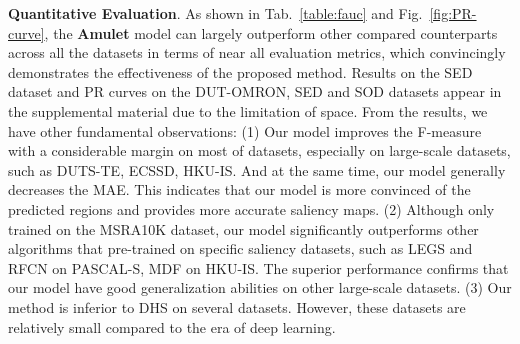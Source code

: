 \documentclass[10pt,twocolumn,letterpaper]{article}
\begin{document}
\textbf{Quantitative Evaluation}. As shown in Tab.~\ref{table:fauc} and Fig.~\ref{fig:PR-curve}, the \textbf{Amulet} model can largely outperform other compared counterparts across all the datasets in terms of near all evaluation metrics, which convincingly demonstrates the effectiveness of the proposed method.
%
Results on the SED dataset and PR curves on the DUT-OMRON, SED and SOD datasets appear in the supplemental material due to the limitation of space.
%
From the results, we have other fundamental observations: (1) Our model improves the F-measure with a considerable margin on most of datasets, especially on large-scale datasets, such as DUTS-TE, ECSSD, HKU-IS.
%
And at the same time, our model generally decreases the MAE.
%
This indicates that our model is more convinced of the predicted regions and provides more accurate saliency maps.
%
(2) Although only trained on the MSRA10K dataset, our model significantly outperforms other algorithms that pre-trained on specific saliency datasets, such as LEGS and RFCN on PASCAL-S, MDF on HKU-IS.
%
The superior performance confirms that our model have good generalization abilities on other large-scale datasets.
(3) Our method is inferior to DHS on several datasets. However, these datasets are relatively small compared to the era of deep learning.
\end{document}
